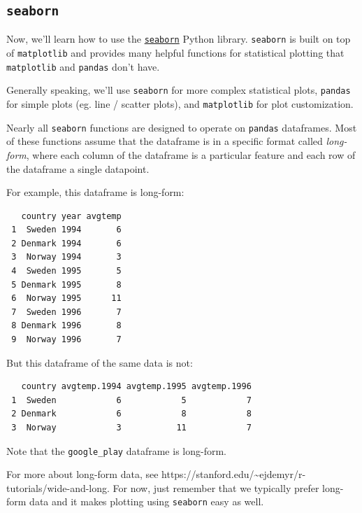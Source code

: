 \documentclass[11pt]{article}
\begin{document}
    \begin{center}
    \end{center}
    { \hspace*{\fill} \\}
    
    \subsection{\texorpdfstring{\texttt{seaborn}}{seaborn}}\label{seaborn}

Now, we'll learn how to use the
\href{http://seaborn.pydata.org/index.html}{\texttt{seaborn}} Python
library. \texttt{seaborn} is built on top of \texttt{matplotlib} and
provides many helpful functions for statistical plotting that
\texttt{matplotlib} and \texttt{pandas} don't have.

Generally speaking, we'll use \texttt{seaborn} for more complex
statistical plots, \texttt{pandas} for simple plots (eg. line / scatter
plots), and \texttt{matplotlib} for plot customization.

Nearly all \texttt{seaborn} functions are designed to operate on
\texttt{pandas} dataframes. Most of these functions assume that the
dataframe is in a specific format called \emph{long-form}, where each
column of the dataframe is a particular feature and each row of the
dataframe a single datapoint.

For example, this dataframe is long-form:

\begin{verbatim}
   country year avgtemp
 1  Sweden 1994       6
 2 Denmark 1994       6
 3  Norway 1994       3
 4  Sweden 1995       5
 5 Denmark 1995       8
 6  Norway 1995      11
 7  Sweden 1996       7
 8 Denmark 1996       8
 9  Norway 1996       7
\end{verbatim}

But this dataframe of the same data is not:

\begin{verbatim}
   country avgtemp.1994 avgtemp.1995 avgtemp.1996
 1  Sweden            6            5            7
 2 Denmark            6            8            8
 3  Norway            3           11            7
\end{verbatim}

Note that the \texttt{google\_play} dataframe is long-form.

For more about long-form data, see
https://stanford.edu/\textasciitilde ejdemyr/r-tutorials/wide-and-long.
For now, just remember that we typically prefer long-form data and it
makes plotting using \texttt{seaborn} easy as well.
\end{document}
